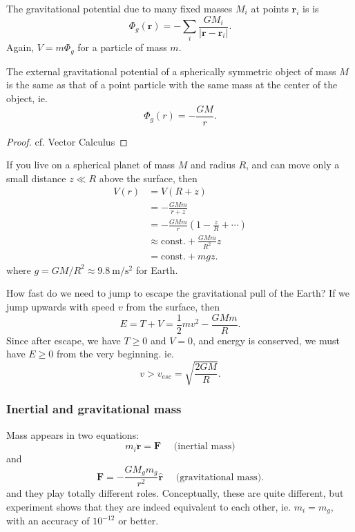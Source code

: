 \documentclass[a4paper]{article}
\begin{document}
\begin{prop}
  The gravitational potential due to many fixed masses $M_i$ at points $\mathbf{r}_i$ is is
  \[
    \Phi_g(\mathbf{r}) = -\sum_i \frac{GM_i}{|\mathbf{r} - \mathbf{r}_i|}.
  \]
  Again, $V = m\Phi_g$ for a particle of mass $m$.
\end{prop}

\begin{prop}
  The external gravitational potential of a spherically symmetric object of mass $M$ is the same as that of a point particle with the same mass at the center of the object, ie.
  \[
    \Phi_g(r) = -\frac{GM}{r}.
  \]
\end{prop}

\begin{proof}
  cf. Vector Calculus
\end{proof}

\begin{eg}
  If you live on a spherical planet of mass $M$ and radius $R$, and can move only a small distance $z \ll R$ above the surface, then
  \begin{align*}
    V(r) &= V(R + z)\\
    &= -\frac{GMm}{r + z}\\
    &= -\frac{GMm}{r}\left(1 - \frac{z}{R} + \cdots\right)\\
    &\approx \text{const.} + \frac{GMm}{R^2}z\\
    &= \text{const.} + mgz.
  \end{align*}
  where $g = GM/R^2 \approx \SI{9.8}{\meter\per\second\squared}$ for Earth.
\end{eg}

\begin{eg}
 How fast do we need to jump to escape the gravitational pull of the Earth? If we jump upwards with speed $v$ from the surface, then
 \[
   E = T + V = \frac{1}{2}mv^2 - \frac{GMm}{R}.
 \]
 Since after escape, we have $T \geq 0$ and $V = 0$, and energy is conserved, we must have $E \geq 0$ from the very beginning. ie.
 \[
   v > v_{esc} = \sqrt{\frac{2GM}{R}}.
 \]
\end{eg}
\subsubsection{Inertial and gravitational mass}
Mass appears in two equations:
\[
  m_i\ddot{\mathbf{r}} = \mathbf{F}\quad \text{ (inertial mass)}
\]
and
\[
  \mathbf{F} = -\frac{GM_gm_g}{r^2}\hat{\mathbf{r}}\quad\text{ (gravitational mass)}.
\]
and they play totally different roles. Conceptually, these are quite different, but experiment shows that they are indeed equivalent to each other, ie. $m_i = m_g$, with an accuracy of $10^{-12}$ or better.
\end{document}
